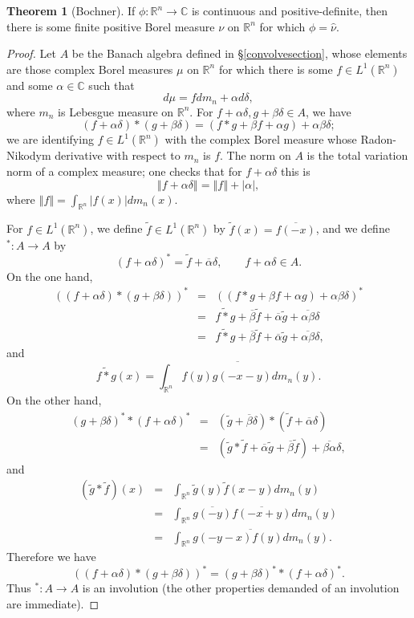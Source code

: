 \documentclass{article}
\newcommand{\norm}[1]{\left\Vert #1 \right\Vert}
\theoremstyle{definition}
\newtheorem{theorem}{Theorem}
\theoremstyle{definition}
\begin{document}
\begin{theorem}[Bochner]
If $\phi:\mathbb{R}^n \to \mathbb{C}$ is continuous and positive-definite, then there is some finite
positive Borel measure $\nu$ on $\mathbb{R}^n$ for which $\phi=\hat{\nu}$.
\end{theorem}
\begin{proof}
Let $A$ be the Banach algebra defined in \S \ref{convolvesection}, whose elements  are those complex Borel measures $\mu$
on $\mathbb{R}^n$ for which there is some $f \in L^1(\mathbb{R}^n)$ and some $\alpha \in \mathbb{C}$ such that
\[
d\mu = f dm_n + \alpha d\delta,
\]
where $m_n$ is Lebesgue measure on $\mathbb{R}^n$. For $f+\alpha \delta, g+\beta \delta \in A$, we have
\[
(f+\alpha \delta) * (g+\beta \delta) = (f *g + \beta f + \alpha g) + \alpha \beta \delta;
\]
we are identifying $f \in L^1(\mathbb{R}^n)$ with the complex Borel measure whose Radon-Nikodym
derivative with respect to $m_n$ is $f$. The norm on $A$ is the total variation norm of a complex measure; one checks that for $f+\alpha \delta$ this is
\[
\norm{f+\alpha \delta}=\norm{f}+|\alpha|,
\]
 where $\norm{f}=\int_{\mathbb{R}^n} |f(x)| dm_n(x)$.

For $f \in L^1(\mathbb{R}^n)$, we define $\widetilde{f} \in L^1(\mathbb{R}^n)$ by $\widetilde{f}(x)=\overline{f(-x)}$, 
and we define $^*:A \to A$ by 
\[
(f+\alpha \delta)^* = \widetilde{f}+\overline{\alpha}\delta, \qquad f+\alpha \delta \in A.
\]
On the one hand,
\begin{eqnarray*}
((f+\alpha\delta)*(g+\beta \delta))^*&=&( (f *g + \beta f + \alpha g) + \alpha \beta \delta)^*\\
&=&\widetilde{f*g} + \overline{\beta} \widetilde{f} + \overline{\alpha} \widetilde{g} + \overline{\alpha \beta} \delta\\
&=&\widetilde{f*g} +  \overline{\beta} \widetilde{f} + \overline{\alpha} \widetilde{g} + \overline{\alpha \beta} \delta,
\end{eqnarray*}
and
\[
\widetilde{f*g}(x) = \overline{\int_{\mathbb{R}^n} f(y)g(-x-y) dm_n(y)}.
\]
On the other hand,
\begin{eqnarray*}
(g+\beta \delta)^* *(f+\alpha \delta)^* &=&(\widetilde{g}+\overline{\beta}\delta)*(\widetilde{f}+\overline{\alpha}\delta)\\
&=&(\widetilde{g}*\widetilde{f} +\overline{\alpha} \widetilde{g}+\overline{\beta} \widetilde{f}) +\overline{\beta \alpha}
\delta,
\end{eqnarray*}
and
\begin{eqnarray*}
(\widetilde{g}*\widetilde{f})(x)&=&\int_{\mathbb{R}^n} \widetilde{g}(y) \widetilde{f}(x-y) dm_n(y)\\
&=&\int_{\mathbb{R}^n} \overline{g(-y)} \overline{f(-x+y)} dm_n(y)\\
&=&\overline{\int_{\mathbb{R}^n} g(-y-x) f(y) dm_n(y)}.
\end{eqnarray*}
Therefore we have
\[
((f+\alpha\delta)*(g+\beta \delta))^* = (g+\beta \delta)^* *(f+\alpha \delta)^*.
\]
Thus $^*:A \to A$ is an involution (the other properties demanded of an involution are immediate).


\end{proof}
\end{document}
